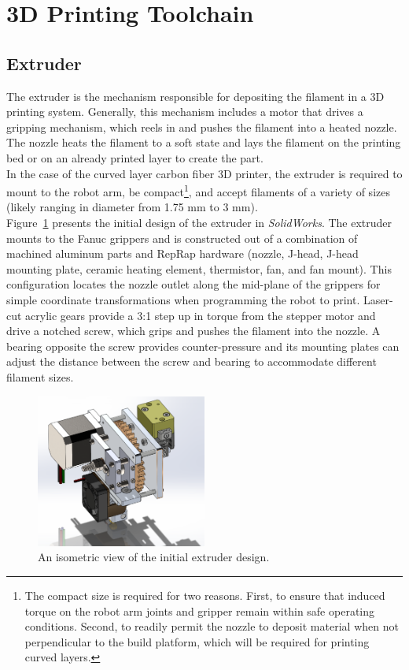 \section{3D Printing Toolchain}

\subsection{Extruder}

\indent

The extruder is the mechanism responsible for depositing the filament in a 3D printing system. Generally, this mechanism includes a motor that drives a gripping mechanism, which reels in and pushes the filament into a heated nozzle. The nozzle heats the filament to a soft state and lays the filament on the printing bed or on an already printed layer to create the part.\\

In the case of the curved layer carbon fiber 3D printer, the extruder is required to mount to the robot arm, be compact\footnote{The compact size is required for two reasons. First, to ensure that induced torque on the robot arm joints and gripper remain within safe operating conditions. Second, to readily permit the nozzle to deposit material when not perpendicular to the build platform, which will be required for printing curved layers.}, and accept filaments of a variety of sizes (likely ranging in diameter from 1.75 mm to 3 mm). \\

Figure~\ref{fig:old extruder} presents the initial design of the extruder in \emph{SolidWorks}. The extruder mounts to the Fanuc grippers and is constructed out of a combination of machined aluminum parts and RepRap hardware (nozzle, J-head, J-head mounting plate, ceramic heating element, thermistor, fan, and fan mount). This configuration locates the nozzle outlet along the mid-plane of the grippers for simple coordinate transformations when programming the robot to print. Laser-cut acrylic gears provide a 3:1 step up in torque from the stepper motor and drive a notched screw, which grips and pushes the filament into the nozzle. A bearing opposite the screw provides counter-pressure and its mounting plates can adjust the distance between the screw and bearing to accommodate different filament sizes.\\

\begin{figure}[h!]
\centering
\includegraphics[width=0.5\textwidth]{./figures/extruder-old-2}
\caption{An isometric view of the initial extruder design.}
\label{fig:old extruder}
\end{figure}

